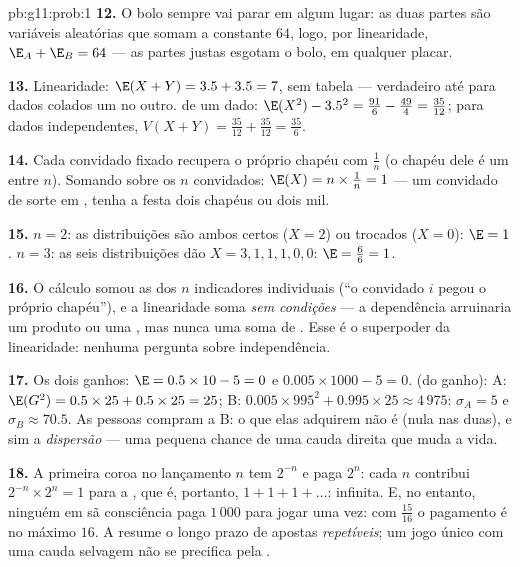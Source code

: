 \begin{solution}{pb:g11:prob:1}
\textbf{12.} O bolo sempre vai parar em algum lugar: as duas
partes são variáveis aleatórias que somam a constante $64$,
logo, por linearidade, $\E_A + \E_B = 64$ --- as partes justas
esgotam o bolo, em qualquer placar.

\textbf{13.} Linearidade: $\E(X + Y) = 3.5 + 3.5 = 7$, sem
tabela --- verdadeiro até para dados colados um no outro.
 de um dado: $\E(X^2) - 3.5^2 = \frac{91}{6} -
\frac{49}{4} = \frac{35}{12}$; para dados independentes,
$V(X + Y) = \frac{35}{12} + \frac{35}{12} = \frac{35}{6}$.

\textbf{14.} Cada convidado fixado recupera o próprio chapéu com
 $\frac1n$ (o chapéu dele é um entre $n$). Somando
sobre os $n$ convidados: $\E(X) = n \times \frac1n = 1$ --- um
convidado de sorte em , tenha a festa dois chapéus ou dois
mil.

\textbf{15.} $n = 2$: as distribuições são ambos certos
($X = 2$) ou trocados ($X = 0$): $\E = 1$. $n = 3$: as seis
distribuições dão $X = 3, 1, 1, 1, 0, 0$:
$\E = \frac{6}{6} = 1$.

\textbf{16.} O cálculo somou as  dos $n$ indicadores
individuais (``o convidado $i$ pegou o próprio chapéu''), e a
linearidade soma  \emph{sem condições} --- a
dependência arruinaria um produto ou uma , mas nunca
uma soma de . Esse é o superpoder da linearidade:
nenhuma pergunta sobre independência.

\textbf{17.} Os dois ganhos: $\E = 0.5 \times 10 - 5 = 0$ e
$0.005 \times 1000 - 5 = 0$.  (do ganho):
A: $\E(G^2) = 0.5 \times 25 + 0.5 \times 25 = 25$;
B: $0.005 \times 995^2 + 0.995 \times 25 \approx 4\,975$:
$\sigma_A = 5$ e $\sigma_B \approx 70.5$. As pessoas compram a
B: o que elas adquirem não é  (nula nas duas), e sim a
\emph{dispersão} --- uma pequena chance de uma cauda direita
que muda a vida.

\textbf{18.} A primeira coroa no lançamento $n$ tem
 $2^{-n}$ e paga $2^n$: cada $n$ contribui
$2^{-n} \times 2^n = 1$ para a , que é, portanto,
$1 + 1 + 1 + \dots$: infinita. E, no entanto, ninguém em sã
consciência paga $1\,000$ para jogar uma vez: com 
$\frac{15}{16}$ o pagamento é no máximo $16$. A 
resume o longo prazo de apostas \emph{repetíveis}; um jogo
único com uma cauda selvagem não se precifica pela .


\end{solution}
